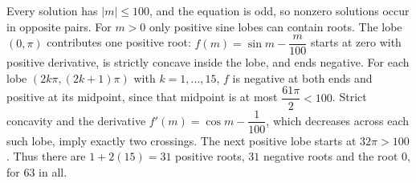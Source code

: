 Every solution has $|m|\le100$, and the equation is odd, so nonzero solutions occur in opposite pairs. For $m>0$ only positive sine lobes can contain roots. The lobe $(0,\pi)$ contributes one positive root: $f(m)=\sin m-\dfrac{m}{100}$ starts at zero with positive derivative, is strictly concave inside the lobe, and ends negative. For each lobe $(2k\pi,(2k+1)\pi)$ with $k=1,\ldots,15$, $f$ is negative at both ends and positive at its midpoint, since that midpoint is at most $\dfrac{61\pi}{2}<100$. Strict concavity and the derivative $f'(m)=\cos m-\dfrac{1}{100}$, which decreases across each such lobe, imply exactly two crossings. The next positive lobe starts at $32\pi>100$. Thus there are $1+2(15)=31$ positive roots, $31$ negative roots and the root $0$, for $\boxed{63}$ in all.
